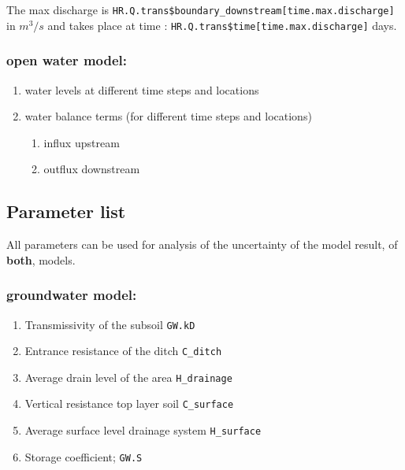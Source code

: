 \documentclass[
]{article}
\begin{document}
The max discharge is
\texttt{HR.Q.trans\$boundary\_downstream{[}time.max.discharge{]}} in
\(m^3/s\) and takes place at time :
\texttt{HR.Q.trans\$time{[}time.max.discharge{]}} days.

\hypertarget{open-water-model}{%
\subsubsection{open water model:}\label{open-water-model}}

\begin{enumerate}
\def\labelenumi{\arabic{enumi}.}
\item
  water levels at different time steps and locations
\item
  water balance terms (for different time steps and locations)

  \begin{enumerate}
  \def\labelenumii{\arabic{enumii}.}
  \item
    influx upstream
  \item
    outflux downstream
  \end{enumerate}
\end{enumerate}

\hypertarget{parameter-list}{%
\subsection{Parameter list}\label{parameter-list}}

All parameters can be used for analysis of the uncertainty of the model
result, of \textbf{both}, models.

\hypertarget{groundwater-model-1}{%
\subsubsection{groundwater model:}\label{groundwater-model-1}}

\begin{enumerate}
\def\labelenumi{\arabic{enumi}.}
\item
  Transmissivity of the subsoil \texttt{GW.kD}
\item
  Entrance resistance of the ditch \texttt{C\_ditch}
\item
  Average drain level of the area \texttt{H\_drainage}
\item
  Vertical resistance top layer soil \texttt{C\_surface}
\item
  Average surface level drainage system \texttt{H\_surface}
\item
  Storage coefficient; \texttt{GW.S}
\end{enumerate}
\end{document}
